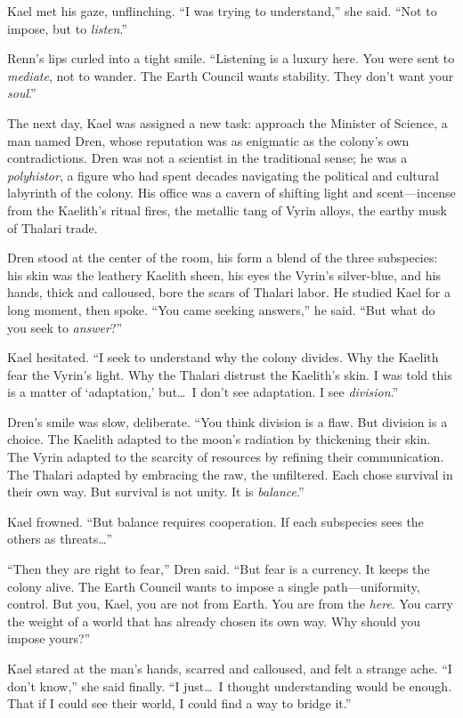 \documentclass{article}
\theoremstyle{plain}
\theoremstyle{definition}
\theoremstyle{remark}
\begin{document}
\begin{tcolorbox}[colback=green!3, colframe=green!40!black, title=\textbf{RcRL (Ours)}, fonttitle=\bfseries, left=2mm, right=2mm, breakable]
Kael met his gaze, unflinching. ``I was trying to understand,'' she said. ``Not to impose, but to \textit{listen}.''

Renn’s lips curled into a tight smile. ``Listening is a luxury here. You were sent to \textit{mediate}, not to wander. The Earth Council wants stability. They don’t want your \textit{soul}.''

The next day, Kael was assigned a new task: approach the Minister of Science, a man named Dren, whose reputation was as enigmatic as the colony’s own contradictions. Dren was not a scientist in the traditional sense; he was a \textit{polyhistor}, a figure who had spent decades navigating the political and cultural labyrinth of the colony. His office was a cavern of shifting light and scent---incense from the Kaelith’s ritual fires, the metallic tang of Vyrin alloys, the earthy musk of Thalari trade.

Dren stood at the center of the room, his form a blend of the three subspecies: his skin was the leathery Kaelith sheen, his eyes the Vyrin’s silver-blue, and his hands, thick and calloused, bore the scars of Thalari labor. He studied Kael for a long moment, then spoke. ``You came seeking answers,'' he said. ``But what do you seek to \textit{answer}?''

Kael hesitated. ``I seek to understand why the colony divides. Why the Kaelith fear the Vyrin’s light. Why the Thalari distrust the Kaelith’s skin. I was told this is a matter of `adaptation,' but\dots\ I don’t see adaptation. I see \textit{division}.''

Dren’s smile was slow, deliberate. ``You think division is a flaw. But division is a choice. The Kaelith adapted to the moon’s radiation by thickening their skin. The Vyrin adapted to the scarcity of resources by refining their communication. The Thalari adapted by embracing the raw, the unfiltered. Each chose survival in their own way. But survival is not unity. It is \textit{balance}.''

Kael frowned. ``But balance requires cooperation. If each subspecies sees the others as threats\dots''

``Then they are right to fear,'' Dren said. ``But fear is a currency. It keeps the colony alive. The Earth Council wants to impose a single path---uniformity, control. But you, Kael, you are not from Earth. You are from the \textit{here}. You carry the weight of a world that has already chosen its own way. Why should you impose yours?''

Kael stared at the man’s hands, scarred and calloused, and felt a strange ache. ``I don’t know,'' she said finally. ``I just\dots\ I thought understanding would be enough. That if I could see their world, I could find a way to bridge it.''


\end{tcolorbox}
\end{document}
